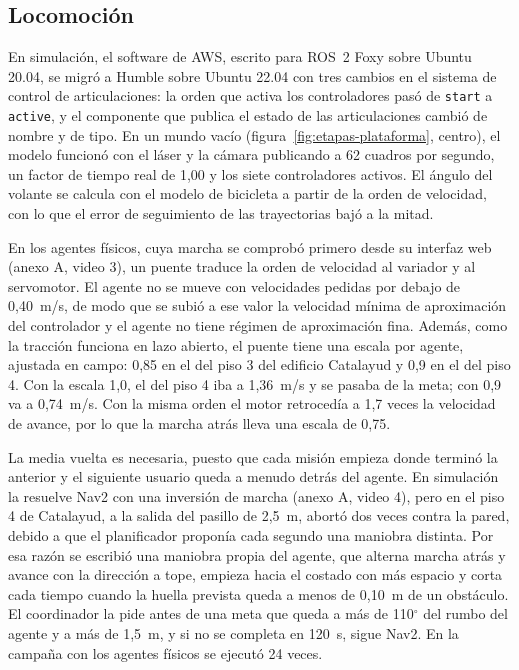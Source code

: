 \subsection{Locomoción}
\label{sec:banda-muerta}
\label{sec:media-vuelta}

En simulación, el software de AWS, escrito para ROS~2 Foxy sobre Ubuntu 20.04, se migró a Humble sobre Ubuntu 22.04 con tres cambios en el sistema de control de articulaciones: la orden que activa los controladores pasó de \texttt{start} a \texttt{active}, y el componente que publica el estado de las articulaciones cambió de nombre y de tipo. En un mundo vacío (figura~\ref{fig:etapas-plataforma}, centro), el modelo funcionó con el láser y la cámara publicando a 62 cuadros por segundo, un factor de tiempo real de 1,00 y los siete controladores activos. El ángulo del volante se calcula con el modelo de bicicleta a partir de la orden de velocidad, con lo que el error de seguimiento de las trayectorias bajó a la mitad.

En los agentes físicos, cuya marcha se comprobó primero desde su interfaz web (anexo A, video 3), un puente traduce la orden de velocidad al variador y al servomotor. El agente no se mueve con velocidades pedidas por debajo de 0,40~m/s, de modo que se subió a ese valor la velocidad mínima de aproximación del controlador y el agente no tiene régimen de aproximación fina. Además, como la tracción funciona en lazo abierto, el puente tiene una escala por agente, ajustada en campo: 0,85 en el del piso 3 del edificio Catalayud y 0,9 en el del piso 4. Con la escala 1,0, el del piso 4 iba a 1,36~m/s y se pasaba de la meta; con 0,9 va a 0,74~m/s. Con la misma orden el motor retrocedía a 1,7 veces la velocidad de avance, por lo que la marcha atrás lleva una escala de 0,75.

La media vuelta es necesaria, puesto que cada misión empieza donde terminó la anterior y el siguiente usuario queda a menudo detrás del agente. En simulación la resuelve Nav2 con una inversión de marcha (anexo A, video 4), pero en el piso 4 de Catalayud, a la salida del pasillo de 2,5~m, abortó dos veces contra la pared, debido a que el planificador proponía cada segundo una maniobra distinta. Por esa razón se escribió una maniobra propia del agente, que alterna marcha atrás y avance con la dirección a tope, empieza hacia el costado con más espacio y corta cada tiempo cuando la huella prevista queda a menos de 0,10~m de un obstáculo. El coordinador la pide antes de una meta que queda a más de 110$^\circ$ del rumbo del agente y a más de 1,5~m, y si no se completa en 120~s, sigue Nav2. En la campaña con los agentes físicos se ejecutó 24 veces.

